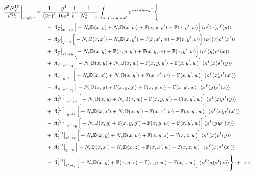 \documentclass[10pt]{article}
\def\mf#1{\mathbb{#1}}
\begin{document}
\begin{align}
\frac{d^{3}N^{\rm III}_{\rm V}}{d^{3}k}\bigg|_{\rm singlet}&=\frac{1}{(2\pi)^{3}}\,\frac{g^{4}}{16\pi^{5}}\,\frac{1}{k^{+}}\,\frac{1}{N_{c}^{2}-1}\,\int_{w,y',z,y,x,x'}e^{-ik\cdot(w-y')}\Bigg\{\notag\\
&\qquad -\,\mathfrak{K}_{\widehat{\mathcal{E}}}\big|_{x'\to x}\,\Big[-N_{c}\mf{D}(x,y)+N_{c}\mf{D}(x,w)+\mf{F}(x,y,y')-\mf{F}(x,y',w)\Big]\,\langle\rho^{f}(x)\rho^{f}(y)\rangle\notag\\
&\qquad -\,\mathfrak{K}_{\widehat{\mathcal{E}}}\big|_{y\to x}\,\Big[-N_{c}\mf{D}(x,x')+N_{c}\mf{D}(x,y')+\mf{F}(x,x',w)-\mf{F}(x,y',w)\Big]\,\langle\rho^{f}(x)\rho^{f}(x')\rangle\notag\\
&\qquad +\,\mathfrak{K}_{\widehat{\mathcal{E}}}\big|_{x'\to y}\,\Big[-N_{c}\mf{D}(x,y)+\mf{F}(x,y,y')+\mf{F}(x,y,w)-\mf{F}(x,y',w)\Big]\,\langle\rho^{f}(y)\rho^{f}(x)\rangle\notag\\
&\qquad +\,\mathfrak{K}_{\Psi}\big|_{x'\to x}\,\Big[-N_{c}\mf{D}(x,y)+N_{c}\mf{D}(x,w)+\mf{F}(x,y,y')-\mf{F}(x,y',w)\Big]\,\langle\rho^{f}(x)\rho^{f}(y)\rangle\notag\\
&\qquad +\,\mathfrak{K}_{\Psi}\big|_{y\to x}\,\Big[-N_{c}\mf{D}(x,x')+N_{c}\mf{D}(x,y')+\mf{F}(x,x',w)-\mf{F}(x,y',w)\Big]\,\langle\rho^{f}(x)\rho^{f}(x')\rangle\notag\\
&\qquad -\,\mathfrak{K}_{\Psi}\big|_{x'\to y}\,\Big[-N_{c}\mf{D}(x,y)+\mf{F}(x,y,y')+\mf{F}(x,y,w)-\mf{F}(x,y',w)\Big]\,\langle\rho^{f}(y)\rho^{f}(x)\rangle\notag\\
&\qquad +\,\mathfrak{K}_{\delta}^{(y')}\big|_{x'\to x}\,\Big[-N_{c}\mf{D}(x,y)+N_{c}\mf{D}(x,w)+\mf{F}(x,y,y')-\mf{F}(x,y',w)\Big]\,\langle\rho^{f}(x)\rho^{f}(y)\rangle\notag\\
&\qquad +\,\mathfrak{K}_{\delta}^{(y')}\big|_{y\to x}\,\Big[-N_{c}\mf{D}(x,x')+N_{c}\mf{D}(x,y')+\mf{F}(x,x',w)-\mf{F}(x,y',w)\Big]\,\langle\rho^{f}(x)\rho^{f}(x')\rangle\notag\\
&\qquad -\,\mathfrak{K}_{\delta}^{(y')}\big|_{x'\to y}\,\Big[-N_{c}\mf{D}(x,y)+\mf{F}(x,y,y')+\mf{F}(x,y,w)-\mf{F}(x,y',w)\Big]\,\langle\rho^{f}(y)\rho^{f}(x)\rangle\notag\\
&\qquad +\,\mathfrak{K}_{\delta}^{(z)}\big|_{x'\to x}\,\Big[-N_{c}\mf{D}(x,y)+N_{c}\mf{D}(x,w)+\mf{F}(x,y,z)-\mf{F}(x,z,w)\Big]\,\langle\rho^{f}(x)\rho^{f}(y)\rangle\notag\\
&\qquad +\,\mathfrak{K}_{\delta}^{(z)}\big|_{y\to x}\,\Big[-N_{c}\mf{D}(x,x')+N_{c}\mf{D}(x,z)+\mf{F}(x,x',w)-\mf{F}(x,z,w)\Big]\,\langle\rho^{f}(x)\rho^{f}(x')\rangle\notag\\
&\qquad -\,\mathfrak{K}_{\delta}^{(z)}\big|_{x'\to y}\,\Big[-N_{c}\mf{D}(x,y)+\mf{F}(x,y,z)+\mf{F}(x,y,w)-\mf{F}(x,z,w)\Big]\,\langle\rho^{f}(y)\rho^{f}(x)\rangle\Bigg\}\;+\;{\rm c.c.}\label{eq:s-III-V}
\end{align}
\end{document}
